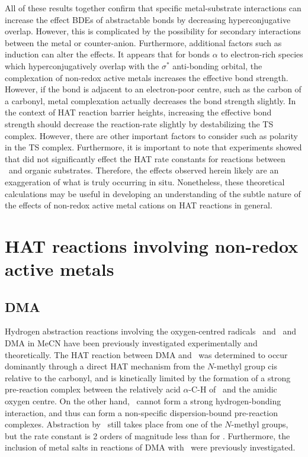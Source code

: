All of these results together confirm that specific metal-substrate interactions can increase the effect BDEs of abstractable  bonds by decreasing hyperconjugative overlap. However, this is complicated by the possibility for secondary interactions between the metal or counter-anion. Furthermore, additional factors such as induction can alter the effects. It appears that for  bonds $\alpha$ to electron-rich species which hyperconjugatively overlap with the $\sigma^*$ anti-bonding orbital, the complexation of non-redox active metals increases the effective  bond strength. However, if the  bond is adjacent to an electron-poor centre, such as the carbon of a carbonyl, metal complexation actually decreases the bond strength slightly. In the context of HAT reaction barrier heights, increasing the effective  bond strength should decrease the reaction-rate slightly by destabilizing the TS complex. However, there are other important factors to consider such as polarity in the TS complex. Furthermore, it is important to note that experiments showed that  did not significantly effect the HAT rate constants for reactions between \cumo\ and organic substrates. Therefore, the effects observed herein likely are an exaggeration of what is truly occurring in situ. Nonetheless, these theoretical calculations may be useful in developing an understanding of the subtle nature of the effects of non-redox active metal cations on HAT reactions in general.

\section{HAT reactions involving non-redox active metals}

\subsection{DMA}

Hydrogen abstraction reactions involving the oxygen-centred radicals \bno\ and \cumo\ and DMA in MeCN have been previously investigated experimentally and theoretically.\cite{Salamone2013} The HAT reaction between DMA and \bno\ was determined to occur dominantly through a direct HAT mechanism from the $N$-methyl group cis relative to the carbonyl, and is kinetically limited by the formation of a strong pre-reaction complex between the relatively acid $\alpha$-C-H of \bno\ and the amidic oxygen centre. On the other hand, \cumo\ cannot form a strong hydrogen-bonding interaction, and thus can form a non-specific dispersion-bound pre-reaction complexes. Abstraction by \cumo\ still takes place from one of the $N$-methyl groups, but the rate constant is 2 orders of magnitude less than for \bno. Furthermore, the inclusion of metal salts in reactions of DMA with \cumo\ were previously investigated.\cite{Salamone2015metals}

